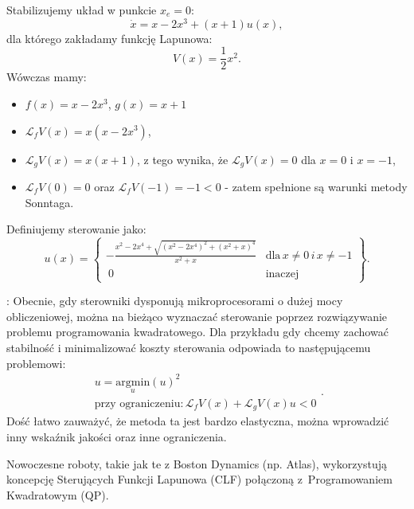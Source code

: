 \documentclass{article}
\begin{document}
\begin{description}
        \begin{tcolorbox}[colback=green!5, colframe=green!75!black, title=Przykład]
        Stabilizujemy układ w punkcie $x_{e} = 0$:
        $$
            \dot{x} = x - 2x^{3} + (x+1)u(x),
        $$
        dla którego zakładamy funkcję Lapunowa:
        $$
            V(x) = \frac{1}{2}x^{2}.
        $$
        Wówczas mamy:
        \begin{itemize}
            \item $f(x) = x - 2x^{3}$, $g(x) = x+1$
            \item $\mathcal{L}_{f}V(x) = x(x - 2x^{3})$,
            \item $\mathcal{L}_{g}V(x) = x(x+1)$, z tego wynika, że $\mathcal{L}_{g}V(x) = 0$ dla $x = 0$ i $x = -1$,
            \item $\mathcal{L}_{f}V(0) = 0$ oraz $\mathcal{L}_{f}V(-1) = -1 < 0$ - zatem spełnione są warunki metody Sonntaga.
        \end{itemize}
        Definiujemy sterowanie jako:
        $$
            u(x)
            =
            \left\{
            \begin{array}{cl}
                 -\frac{x^{2} - 2x^{4} + \sqrt{(x^{2} - 2x^{4})^{2} + (x^{2} + x)^{4}}}{x^{2} + x} &   \text{dla}\, x \neq 0 \, i\, x \neq -1 \\\
                 0  &   \text{inaczej}
            \end{array}
            \right\}.
        $$
        \end{tcolorbox}
    
        \item[Rozwiązywanie online problemu programowania kwadratowego]:
        Obecnie, gdy sterowniki dysponują mikroprocesorami o dużej mocy obliczeniowej, można na bieżąco wyznaczać sterowanie poprzez rozwiązywanie problemu programowania kwadratowego.
        Dla przykładu gdy chcemy zachować stabilność i minimalizować koszty sterowania odpowiada to następującemu problemowi:
        $$
            \begin{array}{c}
                 u = \underset{u}{\mathrm{argmin}} (u)^{2}\\
                 \text{przy ograniczeniu:}\, \mathcal{L}_{f}V(x) + \mathcal{L}_{g}V(x)u < 0
            \end{array}.
        $$
        Dość łatwo zauważyć, że metoda ta jest bardzo elastyczna, można
        wprowadzić inny wskaźnik jakości oraz inne ograniczenia.
        

        \begin{tcolorbox}[colback=magenta!5, colframe=magenta!75!black, title=Zastosowanie w robotyce]
        Nowoczesne roboty, takie jak te z Boston Dynamics (np. Atlas),
        wykorzystują koncepcję Sterujących Funkcji Lapunowa (CLF) połączoną z~Programowaniem Kwadratowym (QP).


\end{tcolorbox}
\end{description}
\end{document}
